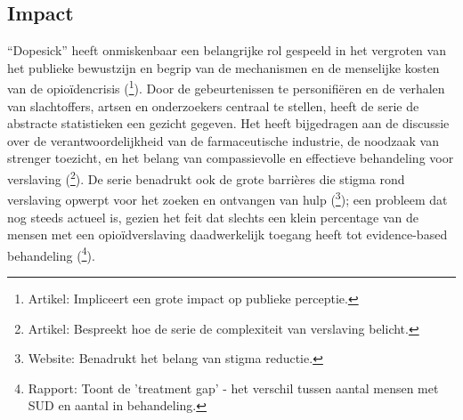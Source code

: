 \documentclass[11pt, a4paper]{report} %
\begin{document}
\subsection{Impact}
\enquote{Dopesick} heeft onmiskenbaar een belangrijke rol gespeeld in het vergroten van het publieke bewustzijn en begrip van de mechanismen en de menselijke kosten van de opioïdencrisis (\cite{HealthlineDopesickTruth}\footnote{Artikel: Impliceert een grote impact op publieke perceptie.}). Door de gebeurtenissen te personifiëren en de verhalen van slachtoffers, artsen en onderzoekers centraal te stellen, heeft de serie de abstracte statistieken een gezicht gegeven. Het heeft bijgedragen aan de discussie over de verantwoordelijkheid van de farmaceutische industrie, de noodzaak van strenger toezicht, en het belang van compassievolle en effectieve behandeling voor verslaving (\cite{AvenuesRecoveryDopesickTrue}\footnote{Artikel: Bespreekt hoe de serie de complexiteit van verslaving belicht.}). De serie benadrukt ook de grote barrières die stigma rond verslaving opwerpt voor het zoeken en ontvangen van hulp (\cite{CDCStigmaReduction}\footnote{Website: Benadrukt het belang van stigma reductie.}); een probleem dat nog steeds actueel is, gezien het feit dat slechts een klein percentage van de mensen met een opioïdverslaving daadwerkelijk toegang heeft tot evidence-based behandeling (\cite{SAMHSA2022NSDUH}\footnote{Rapport: Toont de 'treatment gap' - het verschil tussen aantal mensen met SUD en aantal in behandeling.}).
\end{document}
